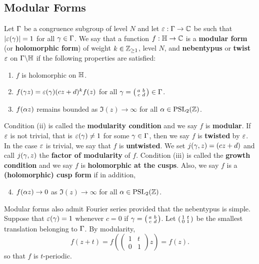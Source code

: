     \subsection*{Modular Forms}
      Let $\Gamma$ be a congruence subgroup of level $N$ and let $\varepsilon:\Gamma \to \mathbb{C}$ be such that $|\varepsilon(\gamma)| = 1$ for all $\gamma \in \Gamma$. We say that a function $f:\mathbb{H} \to \mathbb{C}$ is a \textbf{modular form} (or \textbf{holomorphic form}) of weight $k \in \mathbb{Z}_{\ge 1}$, level $N$, and \textbf{nebentypus} or \textbf{twist} $\varepsilon$ on $\Gamma\backslash\mathbb{H}$ if the following properties are satisfied:
      \begin{enumerate}[label=(\roman*)]
        \item $f$ is holomorphic on $\mathbb{H}$.
        \item $f(\gamma z) = \varepsilon(\gamma)(cz+d)^{k}f(z)$ for all $\gamma = \begin{psmallmatrix} a & b \\ c & d \end{psmallmatrix} \in \Gamma$.
        \item $f(\alpha z)$ remains bounded as $\Im(z) \to \infty$ for all $\alpha \in \mathrm{PSL}_{2}(\mathbb{Z})$.
      \end{enumerate}
      Condition (ii) is called the \textbf{modularity condition} and we say $f$ is \textbf{modular}. If $\varepsilon$ is not trivial, that is $\varepsilon(\gamma) \neq 1$ for some $\gamma \in \Gamma$, then we say $f$ is \textbf{twisted} by $\varepsilon$. In the case $\varepsilon$ is trivial, we say that $f$ is \textbf{untwisted}. We set $j(\gamma,z) = (cz+d)$ and call $j(\gamma,z)$ the \textbf{factor of modularity} of $f$. Condition (iii) is called the \textbf{growth condition} and we say $f$ is \textbf{holomorphic at the cusps}. Also, we say $f$ is a \textbf{(holomorphic) cusp form} if in addition,
      \begin{enumerate}[label=(\roman*)]
        \setcounter{enumi}{3}
        \item $f(\alpha z) \to 0$ as $\Im(z) \to \infty$ for all $\alpha \in \mathrm{PSL}_{2}(\mathbb{Z})$.
      \end{enumerate}

      Modular forms also admit Fourier series provided that the nebentypus is simple. Suppose that $\varepsilon(\gamma) = 1$ whenever $c = 0$ if $\gamma = \begin{psmallmatrix} a & b \\ c & d \end{psmallmatrix}$. Let $\begin{psmallmatrix} 1 & t \\ 0 & 1 \end{psmallmatrix}$ be the smallest translation belonging to $\Gamma$. By modularity,
      \[
        f(z+t) = f\left(\begin{pmatrix} 1 & t \\ 0 & 1 \end{pmatrix}z\right) = f(z).
      \]
      so that $f$ is $t$-periodic.

